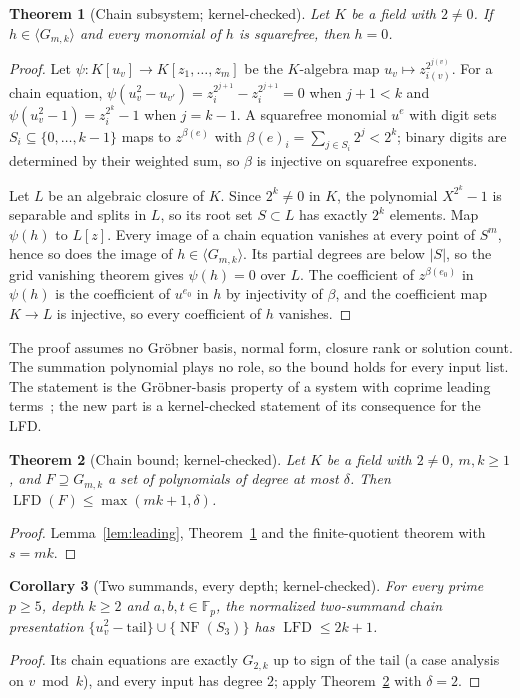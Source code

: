 \documentclass[11pt]{article}
\newtheorem{theorem}{Theorem}
\newtheorem{corollary}[theorem]{Corollary}
\theoremstyle{definition}\newtheorem{definition}[theorem]{Definition}
\theoremstyle{remark}\newtheorem{remark}[theorem]{Remark}
\newcommand{\F}{\mathbb F}
\newcommand{\lfd}{\operatorname{LFD}}
\newcommand{\NF}{\operatorname{NF}}
\begin{document}
\begin{theorem}[Chain subsystem; kernel-checked]\label{thm:reduced}
Let $K$ be a field with $2\ne0$. If $h\in\langle G_{m,k}\rangle$ and every
monomial of $h$ is squarefree, then $h=0$.
\end{theorem}
\begin{proof}
Let $\psi:K[u_v]\to K[z_1,\ldots,z_m]$ be the $K$-algebra map
$u_v\mapsto z_{i(v)}^{2^{j(v)}}$. For a chain equation,
$\psi(u_v^2-u_{v'})=z_i^{2^{j+1}}-z_i^{2^{j+1}}=0$ when $j+1<k$ and
$\psi(u_v^2-1)=z_i^{2^k}-1$ when $j=k-1$. A squarefree monomial $u^e$ with
digit sets $S_i\subseteq\{0,\ldots,k-1\}$ maps to $z^{\beta(e)}$ with
$\beta(e)_i=\sum_{j\in S_i}2^j<2^k$; binary digits are determined by their
weighted sum, so $\beta$ is injective on squarefree exponents.

Let $L$ be an algebraic closure of $K$. Since $2^k\ne0$ in $K$, the
polynomial $X^{2^k}-1$ is separable and splits in $L$, so its root set
$S\subset L$ has exactly $2^k$ elements. Map $\psi(h)$ to $L[z]$. Every
image of a chain equation vanishes at every point of $S^m$, hence so does
the image of $h\in\langle G_{m,k}\rangle$. Its partial degrees are below
$|S|$, so the grid vanishing theorem gives $\psi(h)=0$ over $L$. The
coefficient of $z^{\beta(e_0)}$ in $\psi(h)$ is the coefficient of
$u^{e_0}$ in $h$ by injectivity of $\beta$, and the coefficient map $K\to L$
is injective, so every coefficient of $h$ vanishes.
\end{proof}

The proof assumes no Gr\"obner basis, normal form, closure rank or solution
count. The summation polynomial plays no role, so the bound holds for every
input list. The statement is the Gr\"obner-basis property of a system with
coprime leading terms~\cite[Ch.~2, \S\S9--10]{clo15}; the new part is a
kernel-checked statement of its consequence for the LFD.

\begin{theorem}[Chain bound; kernel-checked]\label{thm:chain}
Let $K$ be a field with $2\ne0$, $m,k\ge1$, and $F\supseteq G_{m,k}$ a set
of polynomials of degree at most $\delta$. Then $\lfd(F)\le\max(mk+1,\delta)$.
\end{theorem}
\begin{proof}
Lemma~\ref{lem:leading}, Theorem~\ref{thm:reduced} and the finite-quotient
theorem with $s=mk$.
\end{proof}

\begin{corollary}[Two summands, every depth; kernel-checked]\label{cor:m2}
For every prime $p\ge5$, depth $k\ge2$ and $a,b,t\in\F_p$, the normalized
two-summand chain presentation $\{u_{v}^2-\text{tail}\}\cup\{\NF(S_3)\}$
has $\lfd\le2k+1$.
\end{corollary}
\begin{proof}
Its chain equations are exactly $G_{2,k}$ up to sign of the tail (a case
analysis on $v\bmod k$), and every input has degree $2$; apply
Theorem~\ref{thm:chain} with $\delta=2$.
\end{proof}
\end{document}

